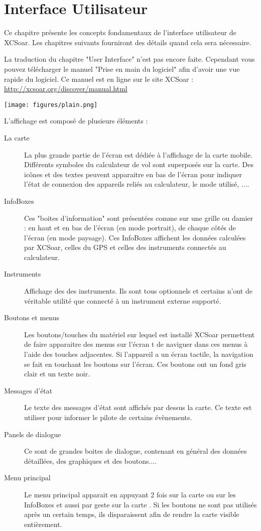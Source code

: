 \chapter{Interface Utilisateur}\label{cha:interface}
Ce chapitre présente les concepts fondamentaux de l'interface utilisateur de XCSoar. Les chapitres suivants fourniront des détails quand cela sera nécessaire.

La traduction du chapitre "User Interface" n'est pas encore faite. Cependant vous pouvez télécharger le manuel "Prise en main du logiciel" afin d'avoir une vue rapide du logiciel.
Ce manuel est en ligne sur le site XCSoar : {\href{http://xcsoar.org/discover/manual.html}{http://xcsoar.org/discover/manual.html}}


\begin{center}
\texttt{[image: figures/plain.png]}
\end{center}

L'affichage est composé de plusieurs éléments :
\begin{description}
\item[La carte] La plus grande partie de l'écran est dédiée à l'affichage de la carte mobile. Différents symboles du calculateur de vol sont superposés sur la carte. Des icônes et des textes peuvent apparaitre en bas de l'écran pour indiquer l'état de connexion des appareils reliés au calculateur, le mode utilisé, ....
\item[InfoBoxes] Ces "boites d'information" sont présentées comme sur une grille ou damier : en haut et en bas de l'écran (en mode portrait), de chaque côtés de l'écran (en mode paysage). Ces InfoBoxes affichent les données calculées par XCSoar, celles du GPS et celles des instruments connectés au calculateur.
\item[Instruments]  Affichage des des instruments. Ils sont tous optionnels et certains n'ont de véritable utilité que connecté à un instrument externe supporté.
\item[Boutons et menus] Les boutons/touches du matériel sur lequel est installé XCSoar permettent de faire apparaitre des menus sur l'écran t de naviguer dans ces menus à l'aide des touches adjacentes. Si l'appareil a un écran tactile, la navigation se fait en touchant les boutons sur l'écran. Ces boutons ont un fond gris clair et un texte noir.
\item[Messages d'état] Le texte des messages d'état sont affichés par dessus la carte. Ce texte est utiliser pour informer le pilote de certains évènements.
\item[Panels de dialogue] Ce sont de grandes boites de dialogue, contenant en général des données détaillées, des graphiques et des boutons....
\item[Menu principal] Le menu principal apparait en appuyant 2 fois sur la carte ou sur les InfoBoxes et aussi par geste sur la carte . Si les boutons ne sont pas utilisés après un certain temps, ils disparaissent afin de rendre la carte visible entièrement.
\end{description}

